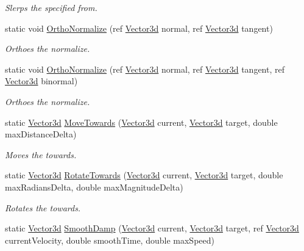 \begin{DoxyCompactItemize}
\begin{DoxyCompactList}\small\item\em Slerps the specified from. \end{DoxyCompactList}\item 
static void \hyperlink{struct_unity_engine_1_1_vector3d_aa627f58e5e64da8c3106df10f40ea8a0}{Ortho\+Normalize} (ref \hyperlink{struct_unity_engine_1_1_vector3d}{Vector3d} normal, ref \hyperlink{struct_unity_engine_1_1_vector3d}{Vector3d} tangent)
\begin{DoxyCompactList}\small\item\em Orthoes the normalize. \end{DoxyCompactList}\item 
static void \hyperlink{struct_unity_engine_1_1_vector3d_a65cedffcca4af2faf8a0c43e74b48967}{Ortho\+Normalize} (ref \hyperlink{struct_unity_engine_1_1_vector3d}{Vector3d} normal, ref \hyperlink{struct_unity_engine_1_1_vector3d}{Vector3d} tangent, ref \hyperlink{struct_unity_engine_1_1_vector3d}{Vector3d} binormal)
\begin{DoxyCompactList}\small\item\em Orthoes the normalize. \end{DoxyCompactList}\item 
static \hyperlink{struct_unity_engine_1_1_vector3d}{Vector3d} \hyperlink{struct_unity_engine_1_1_vector3d_a725d6c801b1eb7d7395ede7b630d994d}{Move\+Towards} (\hyperlink{struct_unity_engine_1_1_vector3d}{Vector3d} current, \hyperlink{struct_unity_engine_1_1_vector3d}{Vector3d} target, double max\+Distance\+Delta)
\begin{DoxyCompactList}\small\item\em Moves the towards. \end{DoxyCompactList}\item 
static \hyperlink{struct_unity_engine_1_1_vector3d}{Vector3d} \hyperlink{struct_unity_engine_1_1_vector3d_a879c68adefb7c05e678bb7ef3331ddd9}{Rotate\+Towards} (\hyperlink{struct_unity_engine_1_1_vector3d}{Vector3d} current, \hyperlink{struct_unity_engine_1_1_vector3d}{Vector3d} target, double max\+Radians\+Delta, double max\+Magnitude\+Delta)
\begin{DoxyCompactList}\small\item\em Rotates the towards. \end{DoxyCompactList}\item 
static \hyperlink{struct_unity_engine_1_1_vector3d}{Vector3d} \hyperlink{struct_unity_engine_1_1_vector3d_af0d5c130168731e106ee29cd28b4fcad}{Smooth\+Damp} (\hyperlink{struct_unity_engine_1_1_vector3d}{Vector3d} current, \hyperlink{struct_unity_engine_1_1_vector3d}{Vector3d} target, ref \hyperlink{struct_unity_engine_1_1_vector3d}{Vector3d} current\+Velocity, double smooth\+Time, double max\+Speed)

\end{DoxyCompactItemize}
